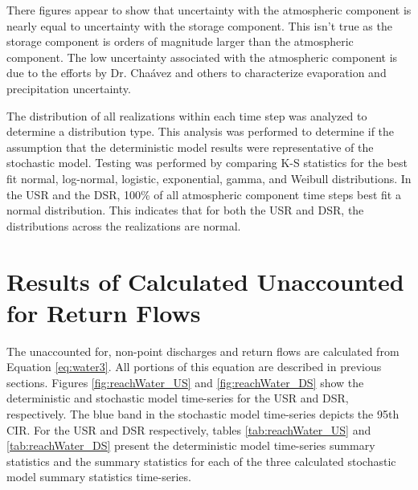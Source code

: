 \begin{linenumbers}
There figures appear to show that uncertainty with the atmospheric component is nearly equal to uncertainty with the storage component.  This isn't true as the storage component is orders of magnitude larger than the atmospheric component.  The low uncertainty associated with the atmospheric component is due to the efforts by Dr. Cha\'{a}vez and others to characterize evaporation and precipitation uncertainty.

The distribution of all realizations within each time step was analyzed to determine a distribution type.  This analysis was performed to determine if the assumption that the deterministic model results were representative of the stochastic model.  Testing was performed by comparing K-S statistics for the best fit normal, log-normal, logistic, exponential, gamma, and Weibull distributions.  In the USR and the DSR, 100\% of all atmospheric component time steps best fit a normal distribution. This indicates that for both the USR and DSR, the distributions across the realizations are normal. 
\clearpage{}

\section{Results of Calculated Unaccounted for Return Flows}
\label{sec:WaterModelResults}

The unaccounted for, non-point discharges and return flows are calculated from Equation \ref{eq:water3}.  All portions of this equation are described in previous sections.  Figures \ref{fig:reachWater_US} and \ref{fig:reachWater_DS} show the deterministic and stochastic model time-series for the USR and DSR, respectively.  The blue band in the stochastic model time-series depicts the 95th CIR.  For the USR and DSR respectively, tables \ref{tab:reachWater_US} and \ref{tab:reachWater_DS} present the deterministic model time-series summary statistics and the summary statistics for each of the three calculated stochastic model summary statistics time-series.


\end{linenumbers}
